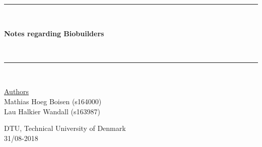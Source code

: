 \begin{titlepage}
\centering
{}
\rule{\textwidth}{1mm}\\
\vspace{0.3cm}

\begin{huge}\bfseries Notes regarding Biobuilders \end{huge}\\

\rule{\textwidth}{1mm}\\
\vspace{1cm}
\begin{minipage}[l]{0.5 \textwidth}
\centering
\large \underline{Authors} \vspace{0.2cm} \\ 
Mathias Hoeg Boisen (s164000) \\
Lau Halkier Wandall (s163987) \\
\end{minipage}%

\begin{figure}[h]
\begin{center}
\noindent{}
\end{center}
\end{figure}

\begin{flushleft}
DTU, Technical University of Denmark\\
31/08-2018 \\
\end{flushleft}
\end{titlepage}

